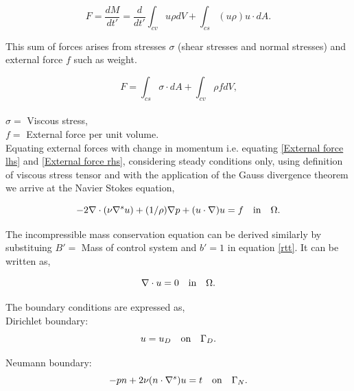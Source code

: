 \documentclass[a4paper,twoside,openright]{book}
\begin{document}
\begin{equation}\label{External force lhs}
F = \frac{dM}{dt'} = \frac{d}{dt'} \int_{cv} u \rho dV + \int_{cs} (u \rho) u\cdot dA \textrm{.}
\end{equation}

This sum of forces arises from stresses $\sigma$ (shear stresses and normal stresses) and external force $f$ such as weight. 

\begin{equation}\label{External force rhs}
F = \int_{cs} \sigma \cdot dA + \int_{cv} \rho f dV \textrm{,}
\end{equation}
\\
$\sigma =$ Viscous stress,\\
$f =$ External force per unit volume.\\

Equating external forces with change in momentum i.e. equating \eqref{External force lhs} and \eqref{External force rhs}, considering steady conditions only, using definition of viscous stress tensor and with the application of the Gauss divergence theorem we arrive at the Navier Stokes equation,

\begin{equation} \label{navier_stokes}
-2\nabla \cdot (\nu \nabla^s u) + (1/\rho) \nabla p + (u \cdot \nabla)u = f \quad   \textnormal{in}  \quad \Omega \textrm{.}
\end{equation} 

The incompressible mass conservation equation can be derived similarly by substituing $B' =$ Mass of control system and $b' = 1$ in equation \eqref{rtt}.  It can be written as,

\begin{equation}\label{mass_conservation}
\nabla \cdot u=0 \quad   \textnormal{in}  \quad \Omega \textrm{.}
\end{equation}

The boundary conditions are expressed as,\\

Dirichlet boundary:
\begin{equation}\label{dirichlet_ns}
u=u_D \quad \textnormal{on} \quad \Gamma_D \textrm{.}
\end{equation}

Neumann boundary:
\begin{equation} \label{neumann_ns}
-pn + 2\nu(n \cdot \nabla^s)u = t \quad   \textnormal{on}  \quad \Gamma_N \textrm{.}
\end{equation}
\end{document}
